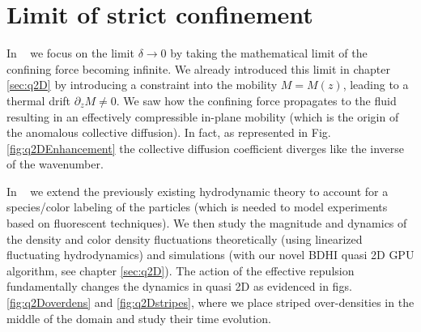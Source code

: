\documentclass[twoside,openright,titlepage,numbers=noenddot,%
headinclude,footinclude,cleardoublepage=empty,abstract=on,
BCOR=5mm,fontsize=11pt, dvipsnames, paper=b5
]{scrreprt}
\newcommand{\gpu}{\gls{GPU}\xspace}
\begin{document}

\section{Limit of strict confinement}\label{sec:strictconf}
In ~\cite{Pelaez2018} we focus on the limit $\delta\rightarrow 0$ by taking the mathematical limit of the confining force becoming infinite. We already introduced this limit in chapter \ref{sec:q2D} by introducing a constraint into the mobility $M=M(z)$, leading to a thermal drift $\partial_zM\neq 0$. We saw how the confining force propagates to the fluid resulting in an effectively compressible in-plane mobility (which is the origin of the anomalous collective diffusion). In fact, as represented in Fig. \ref{fig:q2DEnhancement} the collective diffusion coefficient diverges like the inverse of the wavenumber.

In ~\cite{Pelaez2018} we extend the previously existing hydrodynamic theory to account for a species/color labeling of the particles (which is needed to model experiments based on fluorescent techniques). We then study the magnitude and dynamics of the density and color density fluctuations theoretically (using linearized fluctuating hydrodynamics) and simulations (with our novel \gls{BDHI} quasi 2D \gpu algorithm, see chapter \ref{sec:q2D}).
The action of the effective repulsion fundamentally changes the dynamics in quasi 2D as evidenced in figs. \ref{fig:q2Doverdens} and \ref{fig:q2Dstripes}, where we place striped over-densities in the middle of the domain and study their time evolution.
\end{document}
